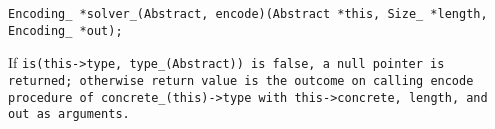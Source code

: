 
\tt{Encoding_ *solver_(Abstract, encode)(Abstract *this, Size_ *length, Encoding_ *out);}


If \tt{is(this->type, type_(Abstract))} is \tt{false},
a null pointer is returned; otherwise return value is the outcome
on calling \tt{encode} procedure of \tt{concrete_(this)->type}
with \tt{this->concrete}, \tt{length}, and \tt{out} as arguments.
